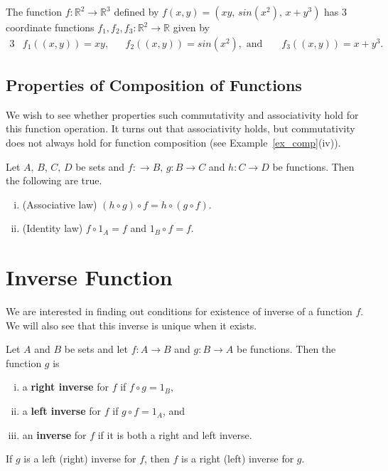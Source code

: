 \documentclass[a4paper,english,12pt]{article}
\begin{document}
\begin{exmp}
The function $f:\mathbb{R}^2\rightarrow \mathbb{R}^3$ defined by $f(x,y)=(xy,\,sin(x^2),\,x+y^3)$ has 3 coordinate functions $f_1,f_2,f_3:\mathbb{R}^2\rightarrow \mathbb{R}$ given by 
\begin{alignat*}{3}
&f_1((x,y))=xy, && f_2((x,y))=sin(x^2), \text{ and } && f_3((x,y))=x+y^3.
\end{alignat*}
\end{exmp}

\subsection{Properties of Composition of Functions}
We wish to see whether properties such commutativity and associativity hold for this function operation. It turns out that associativity holds, but commutativity does not always hold for function composition (see Example~\ref{ex_comp}(iv)).
\begin{lem}
Let $A,\,B,\,C,\,D$ be sets and $f:\rightarrow B,\, g:B\rightarrow C$ and $h:C\rightarrow D$ be functions. Then the following are true.
\begin{enumerate}[i)]
\item (Associative law) $(h\circ g)\circ f=h\circ (g\circ f)$.
\item (Identity law) $f\circ 1_A=f$ and $1_B\circ f=f$.
\end{enumerate}
\end{lem}

\section{Inverse Function}
We are interested in finding out conditions for existence of inverse of a function $f$. We will also see that this inverse is unique when it exists.
\begin{defn}[Existence]
Let $A$ and $B$ be sets and let $f:A \to  B$ and $g:B \to A$ be functions. Then the function $g$ is 
\begin{enumerate}[i)]
\item a \textbf{right inverse} for $f$ if $f\circ g=1_B$,
\item a \textbf{left inverse} for $f$ if $g\circ f=1_A$, and
\item an \textbf{inverse} for $f$ if it is both a right and left inverse.
\end{enumerate}
\end{defn}
\begin{rem}If $g$ is a left (right) inverse for $f$, then $f$ is a right (left) inverse for $g$.
\end{rem}
\end{document}
